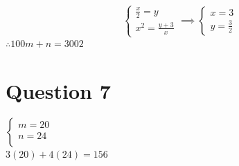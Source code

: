 \documentclass{article}
\begin{document}
\[
\begin{cases}
\frac x 2=y\\
x^2=\frac{y+3}{x}
\end{cases}
\implies
\begin{cases}
x=3\\
y=\frac 3 2
\end{cases}
\]
$\therefore 100m+n=\boxed{3002}$


\section*{Question 7}
$\begin{cases}
m=20\\
n=24\\
\end{cases}$\\
$3(20)+4(24)=\boxed{156}$
\end{document}
